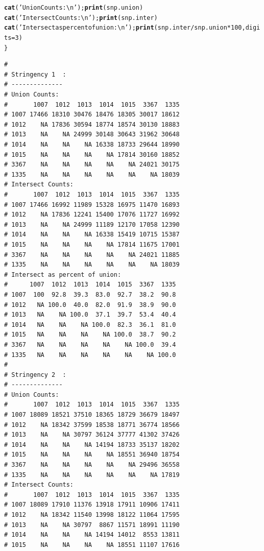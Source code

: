 \documentclass{article}\usepackage[]{graphicx}\usepackage[]{color}
\makeatletter
\newcommand{\hlnum}[1]{\textcolor[rgb]{0.686,0.059,0.569}{#1}}%
\newcommand{\hlstr}[1]{\textcolor[rgb]{0.192,0.494,0.8}{#1}}%
\newcommand{\hlopt}[1]{\textcolor[rgb]{0,0,0}{#1}}%
\newcommand{\hlstd}[1]{\textcolor[rgb]{0.345,0.345,0.345}{#1}}%
\newcommand{\hlkwc}[1]{\textcolor[rgb]{0.333,0.667,0.333}{#1}}%
\newcommand{\hlkwd}[1]{\textcolor[rgb]{0.737,0.353,0.396}{\textbf{#1}}}%
\newenvironment{kframe}{%
 \def\at@end@of@kframe{}%
 \ifinner\ifhmode%
  \def\at@end@of@kframe{\end{minipage}}%
  \begin{minipage}{\columnwidth}%
 \fi\fi%
 \def\FrameCommand##1{\hskip\@totalleftmargin \hskip-\fboxsep
 \colorbox{shadecolor}{##1}\hskip-\fboxsep
     \hskip-\linewidth \hskip-\@totalleftmargin \hskip\columnwidth}%
 \MakeFramed {\advance\hsize-\width
   \@totalleftmargin\z@ \linewidth\hsize
   \@setminipage}}%
 {\par\unskip\endMakeFramed%
 \at@end@of@kframe}
\newenvironment{knitrout}{}{} %
\makeatother
\begin{document}
\begin{knitrout}
\begin{kframe}
\begin{alltt}
  \hlkwd{cat}\hlstd{(}\hlstr{'Union Counts:\textbackslash{}n'}\hlstd{);}                  \hlkwd{print}\hlstd{(snp.union)}
  \hlkwd{cat}\hlstd{(}\hlstr{'Intersect Counts:\textbackslash{}n'}\hlstd{);}              \hlkwd{print}\hlstd{(snp.inter)}
  \hlkwd{cat}\hlstd{(}\hlstr{'Intersect as percent of union:\textbackslash{}n'}\hlstd{);} \hlkwd{print}\hlstd{(snp.inter}\hlopt{/}\hlstd{snp.union}\hlopt{*}\hlnum{100}\hlstd{,}\hlkwc{digits}\hlstd{=}\hlnum{3}\hlstd{)}
\hlstd{\}}
\end{alltt}
\begin{verbatim}
# 
# Stringency 1  :
# --------------
# Union Counts:
#       1007  1012  1013  1014  1015  3367  1335
# 1007 17466 18310 30476 18476 18305 30017 18612
# 1012    NA 17836 30594 18774 18574 30130 18883
# 1013    NA    NA 24999 30148 30643 31962 30648
# 1014    NA    NA    NA 16338 18733 29644 18990
# 1015    NA    NA    NA    NA 17814 30160 18852
# 3367    NA    NA    NA    NA    NA 24021 30175
# 1335    NA    NA    NA    NA    NA    NA 18039
# Intersect Counts:
#       1007  1012  1013  1014  1015  3367  1335
# 1007 17466 16992 11989 15328 16975 11470 16893
# 1012    NA 17836 12241 15400 17076 11727 16992
# 1013    NA    NA 24999 11189 12170 17058 12390
# 1014    NA    NA    NA 16338 15419 10715 15387
# 1015    NA    NA    NA    NA 17814 11675 17001
# 3367    NA    NA    NA    NA    NA 24021 11885
# 1335    NA    NA    NA    NA    NA    NA 18039
# Intersect as percent of union:
#      1007  1012  1013  1014  1015  3367  1335
# 1007  100  92.8  39.3  83.0  92.7  38.2  90.8
# 1012   NA 100.0  40.0  82.0  91.9  38.9  90.0
# 1013   NA    NA 100.0  37.1  39.7  53.4  40.4
# 1014   NA    NA    NA 100.0  82.3  36.1  81.0
# 1015   NA    NA    NA    NA 100.0  38.7  90.2
# 3367   NA    NA    NA    NA    NA 100.0  39.4
# 1335   NA    NA    NA    NA    NA    NA 100.0
# 
# Stringency 2  :
# --------------
# Union Counts:
#       1007  1012  1013  1014  1015  3367  1335
# 1007 18089 18521 37510 18365 18729 36679 18497
# 1012    NA 18342 37599 18538 18771 36774 18566
# 1013    NA    NA 30797 36124 37777 41302 37426
# 1014    NA    NA    NA 14194 18733 35137 18202
# 1015    NA    NA    NA    NA 18551 36940 18754
# 3367    NA    NA    NA    NA    NA 29496 36558
# 1335    NA    NA    NA    NA    NA    NA 17819
# Intersect Counts:
#       1007  1012  1013  1014  1015  3367  1335
# 1007 18089 17910 11376 13918 17911 10906 17411
# 1012    NA 18342 11540 13998 18122 11064 17595
# 1013    NA    NA 30797  8867 11571 18991 11190
# 1014    NA    NA    NA 14194 14012  8553 13811
# 1015    NA    NA    NA    NA 18551 11107 17616

\end{verbatim}
\end{kframe}
\end{knitrout}
\end{document}
